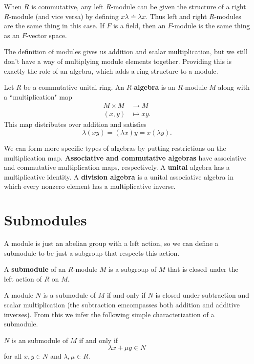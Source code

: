 \documentclass[twoside,10pt]{report}
\begin{document}
When $R$ is commutative, any left $R$-module can be given the structure of a right $R$-module (and vice versa) by defining $x \lambda \doteq \lambda x$. Thus left and right $R$-modules are the same thing in this case. If $F$ is a field, then an $F$-module is the same thing as an $F$-vector space.

The definition of modules gives us addition and scalar multiplication, but we still don't have a way of multiplying module elements together. Providing this is exactly the role of an algebra, which adds a ring structure to a module. 

\begin{defn}[]
Let $R$ be a commutative unital ring. An $R$-\textbf{algebra} is an $R$-module $M$ along with a ``multiplication" map
\begin{align*}
	M \times M &\to M \\
	(x,y) &\mapsto xy.
\end{align*}
This map distributes over addition and satisfies
\[
	\lambda(xy) = (\lambda x)y = x (\lambda y).
\] 
\end{defn}
We can form more specific types of algebras by putting restrictions on the multiplication map. \textbf{Associative and commutative algebras} have associative and commutative multiplication maps, respectively. A \textbf{unital} algebra has a multiplicative identity. A \textbf{division algebra} is a unital associative algebra in which every nonzero element has a multiplicative inverse.

\section{Submodules}

A module is just an abelian group with a left action, so we can define a submodule to be just a subgroup that respects this action.

\begin{defn}[]
A \textbf{submodule} of an $R$-module $M$ is a subgroup of $M$ that is closed under the left action of $R$ on $M$.
\end{defn}

A module $N$ is a submodule of $M$ if and only if $N$ is closed under subtraction and scalar multiplication (the subtraction emcompasses both addition and additive inverses). From this we infer the following simple characterization of a submodule.
\begin{prop}
$N$ is an submodule of $M$ if and only if
\[
\lambda x + \mu y \in N
\] for all $x,y \in N$ and $\lambda,\mu \in R$.
\end{prop}
\end{document}
